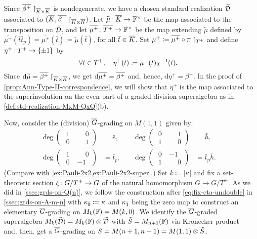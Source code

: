 Since $\barr {\beta^+}\restriction_{\barr K \times \barr K}$ is nondegenerate, we have a chosen standard realization $\widetilde {\mathcal{D}}$ associated to $(\barr{K}, \barr{\beta^+}\restriction_{\barr K \times \barr K})$. 
Let $ {\widetilde\mu}\from \barr{K} \to \FF^\times$ be the map associated to the transposition on $\widetilde {\mathcal{D}}$, and let $\barr{\mu^+}\from \barr{T^+} \to \FF^\times$ be the map extending $\widetilde\mu$ defined by $\overline{\mu^+}(\bar t \bar t_p) = \overline{\mu^+}(\bar t) \coloneqq \widetilde\mu (\bar t)$, for all $\bar t\in \barr K$. 
Set $\mu^+ \coloneqq \barr {\mu^+} \circ \pi\restriction_{T^+}$ and define $\eta^+\colon T^+ \to \{ \pm 1 \}$ by
\[\label{eq:fix-eta-plus-undouble-Ann}
    \forall t\in T^+, \quad \eta^+(t) \coloneqq \mu^+(t) \chi^{-1}(t).
\] 
Since $\mathrm{d} \widetilde\mu = \barr{\beta^+}\restriction_{\barr K \times \barr K}$, we get $\mathrm{d} \overline{\mu^+} = \barr{\beta^+}$ and, hence, $\mathrm{d} \eta^+ = \beta^+$.  
In the proof of \cref{prop:Ann-Type-II-correspondence}, we will show that $\eta^+$ is the map associated to the superinvolution on the even part of a graded-division superalgebra as in \cref{def:std-realization-MxM-QxQ}(b). 

Now, consider the (division) $\barr G$-grading on $M(1,1)$ given by:
%
\[\label{eq:bar-G-grd-on-M(1-1)}
\begin{aligned}
	\deg \left(\begin{array}{c|c}
		 \phantom{.}1\phantom{.} & \phantom{-}0 \\
		\hline
		 \phantom{.}0\phantom{.} & \phantom{-}1 
	\end{array}\right) &= \bar e,\quad & \deg \left(\begin{array}{c|c}
		 \phantom{.}0\phantom{.} & \phantom{-}1 \\
		\hline
		 \phantom{.}1\phantom{.} & \phantom{-}0 
	\end{array}\right) &= \bar h, \\
	\deg \left(\begin{array}{c|c}
		 \phantom{.}1\phantom{.} & \phantom{-}0 \\
		\hline
		 \phantom{.}0\phantom{.} & -1 
	\end{array}\right) &= \bar t_p,\quad &
	\deg \left(\begin{array}{c|c}
		 \phantom{.}0\phantom{.} & -1           \\
		\hline
		 \phantom{.}1\phantom{.} & \phantom{-}0 
	\end{array}\right) &= \bar t_p \bar h.
\end{aligned}
\]
(Compare with \cref{ex:Pauli-2x2,ex:Pauli-2x2-super}.) 
Set $k \coloneqq |\kappa|$ and fix a set-theoretic section $\xi\colon G/T^+ \to G$ of the natural homomorphism $G \to G/T^+$. 
As we did in \cref{ssec:grds-on-Q(n)}, we follow the construction after \cref{eq:fix-eta-undouble} in \cref{ssec:grds-on-A-m-n} with $\kappa_{\bar{0}} \coloneqq \kappa$ and $\kappa_{\bar{1}}$ being the zero map to construct an elementary $\barr G$-grading on $M_k(\mathbb{F}) = M(k , 0)$. 
We identify the $\barr G$-graded superalgebra $M_{k}(\widetilde {\mathcal{D}}) = M_{k}(\mathbb{F}) \otimes \widetilde {\mathcal{D}}$ with $\tilde S = M_{n+1}(\mathbb{F})$ via Kronecker product and, then, get a $\barr G$-grading on $S = M(n+1, n+1) = M(1,1) \otimes \tilde S$. 

